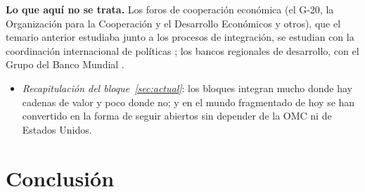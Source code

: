 \documentclass[11pt]{article}
\begin{document}
\begin{anotaciones}
\textbf{Lo que aquí no se trata.} Los foros de cooperación económica (el G-20, la Organización para la Cooperación y el Desarrollo Económicos y otros), que el temario anterior estudiaba junto a los procesos de integración, se estudian con la coordinación internacional de políticas ; los bancos regionales de desarrollo, con el Grupo del Banco Mundial .
\end{anotaciones}

\begin{itemize}
\item \emph{Recapitulación del bloque~\ref{sec:actual}}: los bloques integran mucho donde hay cadenas de valor y poco donde no; y en el mundo fragmentado de hoy se han convertido en la forma de seguir abiertos sin depender de la OMC ni de Estados Unidos.
\end{itemize}

\section*{Conclusión}
\end{document}
